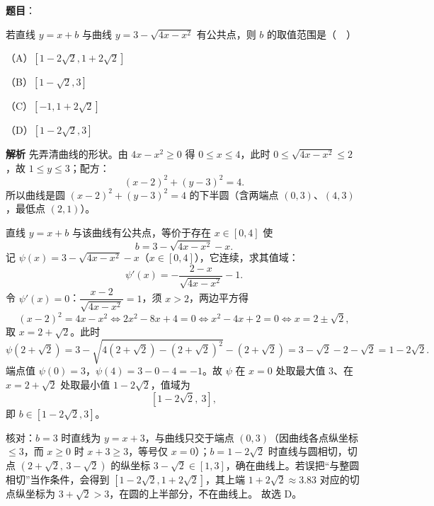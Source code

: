 \begin{answer}

\textbf{题目}：

若直线 $y=x+b$ 与曲线 $y=3-\sqrt{4x-x^2}$ 有公共点，则 $b$ 的取值范围是（　）

（A）$[1-2\sqrt2,1+2\sqrt2]$

（B）$[1-\sqrt2,3]$

（C）$[-1,1+2\sqrt2]$

（D）$[1-2\sqrt2,3]$

\textbf{解析}
先弄清曲线的形状。由 $4x-x^2\geqslant0$ 得 $0\leqslant x\leqslant4$，此时 $0\leqslant\sqrt{4x-x^2}\leqslant2$，故 $1\leqslant y\leqslant3$；配方：
\nopagebreak[4]
\[(x-2)^2+(y-3)^2=4.\]
所以曲线是圆 $(x-2)^2+(y-3)^2=4$ 的下半圆（含两端点 $(0,3)$、$(4,3)$，最低点 $(2,1)$）。

直线 $y=x+b$ 与该曲线有公共点，等价于存在 $x\in[0,4]$ 使
\nopagebreak[4]
\[b=3-\sqrt{4x-x^2}-x.\]
记 $\psi(x)=3-\sqrt{4x-x^2}-x$（$x\in[0,4]$），它连续，求其值域：
\nopagebreak[4]
\[\psi'(x)=-\frac{2-x}{\sqrt{4x-x^2}}-1.\]
令 $\psi'(x)=0$：$\dfrac{x-2}{\sqrt{4x-x^2}}=1$，须 $x>2$，两边平方得
\nopagebreak[4]
\[(x-2)^2=4x-x^2\iff 2x^2-8x+4=0\iff x^2-4x+2=0\iff x=2\pm\sqrt2,\]
取 $x=2+\sqrt2$。此时
\nopagebreak[4]
\[\psi\left(2+\sqrt2\right)=3-\sqrt{4(2+\sqrt2)-(2+\sqrt2)^2}-(2+\sqrt2)=3-\sqrt2-2-\sqrt2=1-2\sqrt2.\]
端点值 $\psi(0)=3$，$\psi(4)=3-0-4=-1$。故 $\psi$ 在 $x=0$ 处取最大值 $3$、在 $x=2+\sqrt2$ 处取最小值 $1-2\sqrt2$，值域为
\nopagebreak[4]
\[\left[1-2\sqrt2,\ 3\right],\]
即 $b\in[1-2\sqrt2,3]$。

核对：$b=3$ 时直线为 $y=x+3$，与曲线只交于端点 $(0,3)$（因曲线各点纵坐标 $\leqslant3$，而 $x\geqslant0$ 时 $x+3\geqslant3$，等号仅 $x=0$）；$b=1-2\sqrt2$ 时直线与圆相切，切点 $\left(2+\sqrt2,\,3-\sqrt2\right)$ 的纵坐标 $3-\sqrt2\in[1,3]$，确在曲线上。若误把“与整圆相切”当作条件，会得到 $\left[1-2\sqrt2,1+2\sqrt2\right]$，其上端 $1+2\sqrt2\approx3.83$ 对应的切点纵坐标为 $3+\sqrt2>3$，在圆的上半部分，不在曲线上。
故选 D。


\end{answer}
